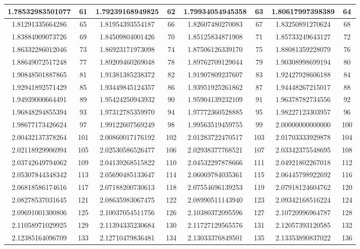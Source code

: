\documentclass{exam}
\begin{document}
\begin{figure}
\begin{tabular}{|c|c||c|c||c|c||c|c|}
\hline
1.78532983501077 & 61 &1.79239168949825 & 62 &1.79934054945358 & 63 &1.80617997398389 & 64 \\
\hline
1.81291335664286 & 65 &1.81954393554187 & 66 &1.82607480270083 & 67 &1.83250891270624 & 68 \\
\hline
1.83884909073726 & 69 &1.84509804001426 & 70 &1.85125834871908 & 71 &1.85733249643127 & 72 \\
\hline
1.86332286012046 & 73 &1.86923171973098 & 74 &1.87506126339170 & 75 &1.88081359228079 & 76 \\
\hline
1.88649072517248 & 77 &1.89209460269048 & 78 &1.89762709129044 & 79 &1.90308998699194 & 80 \\
\hline
1.90848501887865 & 81 &1.91381385238372 & 82 &1.91907809237607 & 83 &1.92427928606188 & 84 \\
\hline
1.92941892571429 & 85 &1.93449845124357 & 86 &1.93951925261862 & 87 &1.94448267215017 & 88 \\
\hline
1.94939000664491 & 89 &1.95424250943932 & 90 &1.95904139232109 & 91 &1.96378782734556 & 92 \\
\hline
1.96848294855394 & 93 &1.97312785359970 & 94 &1.97772360528885 & 95 &1.98227123303957 & 96 \\
\hline
1.98677173426624 & 97 &1.99122607569249 & 98 &1.99563519459755 & 99 &2.00000000000000 & 100 \\
\hline
2.00432137378264 & 101 &2.00860017176192 & 102 &2.01283722470517 & 103 &2.01703333929878 & 104 \\
\hline
2.02118929906994 & 105 &2.02530586526477 & 106 &2.02938377768521 & 107 &2.03342375548695 & 108 \\
\hline
2.03742649794062 & 109 &2.04139268515822 & 110 &2.04532297878666 & 111 &2.04921802267018 & 112 \\
\hline
2.05307844348342 & 113 &2.05690485133647 & 114 &2.06069784035361 & 115 &2.06445798922692 & 116 \\
\hline
2.06818586174616 & 117 &2.07188200730613 & 118 &2.07554696139253 & 119 &2.07918124604762 & 120 \\
\hline
2.08278537031645 & 121 &2.08635983067475 & 122 &2.08990511143940 & 123 &2.09342168516224 & 124 \\
\hline
2.09691001300806 & 125 &2.10037054511756 & 126 &2.10380372095596 & 127 &2.10720996964787 & 128 \\
\hline
2.11058971029925 & 129 &2.11394335230684 & 130 &2.11727129565576 & 131 &2.12057393120585 & 132 \\
\hline
2.12385164096709 & 133 &2.12710479836481 & 134 &2.13033376849501 & 135 &2.13353890837022 & 136 \\

\end{tabular}
\end{figure}
\end{document}
